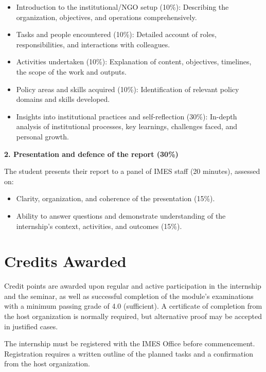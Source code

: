 \documentclass[
  letterpaper,
  10pt,
  openany]{book}
\providecommand{\tightlist}{%
  \setlength{\itemsep}{0pt}\setlength{\parskip}{0pt}}\usepackage{longtable,booktabs,array}
\begin{document}
\begin{itemize}
\tightlist
\item
  Introduction to the institutional/NGO setup (10\%): Describing the
  organization, objectives, and operations comprehensively.
\item
  Tasks and people encountered (10\%): Detailed account of roles,
  responsibilities, and interactions with colleagues.
\item
  Activities undertaken (10\%): Explanation of content, objectives,
  timelines, the scope of the work and outputs.
\item
  Policy areas and skills acquired (10\%): Identification of relevant
  policy domains and skills developed.
\item
  Insights into institutional practices and self-reflection (30\%):
  In-depth analysis of institutional processes, key learnings,
  challenges faced, and personal growth.
\end{itemize}

\textbf{2. Presentation and defence of the report (30\%)}

The student presents their report to a panel of IMES staff (20 minutes),
assessed on:

\begin{itemize}
\tightlist
\item
  Clarity, organization, and coherence of the presentation (15\%).
\item
  Ability to answer questions and demonstrate understanding of the
  internship's context, activities, and outcomes (15\%).
\end{itemize}

\section*{Credits Awarded}\label{credits-awarded-4}


Credit points are awarded upon regular and active participation in the
internship and the seminar, as well as successful completion of the
module's examinations with a minimum passing grade of 4.0 (sufficient).
A certificate of completion from the host organization is normally
required, but alternative proof may be accepted in justified cases.

The internship must be registered with the IMES Office before
commencement. Registration requires a written outline of the planned
tasks and a confirmation from the host organization.
\end{document}
